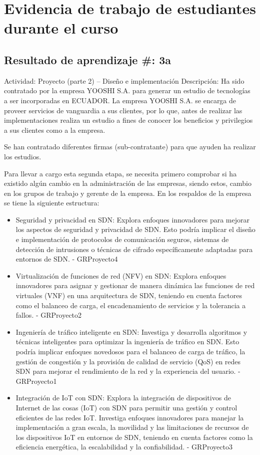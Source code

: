 \newpage
\section{Evidencia de trabajo de estudiantes durante el curso}

\subsection{Resultado de aprendizaje \#: 3a}
\label{sec:ra3a}
Actividad: Proyecto (parte 2) – Diseño e implementación
Descripción:
Ha sido contratado por la empresa YOOSHI S.A. para generar un estudio de tecnologías a ser incorporadas en ECUADOR. La empresa YOOSHI S.A. se encarga de proveer servicios de vanguardia a sus clientes, por lo que, antes de realizar las implementaciones realiza un estudio a fines de conocer los beneficios y privilegios a sus clientes como a la empresa. 

Se han contratado diferentes firmas (sub-contratante) para que ayuden ha realizar los estudios.

Para llevar a cargo esta segunda etapa, se necesita primero comprobar si ha existido algún cambio en la administración de las empresas, siendo estos, cambio en los grupos de trabajo y gerente de la empresa. En los respaldos de la empresa se tiene la siguiente estructura:  
\begin{itemize}
    \item Seguridad y privacidad en SDN: Explora enfoques innovadores para mejorar los aspectos de seguridad y privacidad de SDN. Esto podría implicar el diseño e implementación de protocolos de comunicación seguros, sistemas de detección de intrusiones o técnicas de cifrado específicamente adaptadas para entornos de SDN. - GRProyecto4
    \item Virtualización de funciones de red (NFV) en SDN: Explora enfoques innovadores para asignar y gestionar de manera dinámica las funciones de red virtuales (VNF) en una arquitectura de SDN, teniendo en cuenta factores como el balanceo de carga, el encadenamiento de servicios y la tolerancia a fallos. - GRProyecto2
    \item Ingeniería de tráfico inteligente en SDN: Investiga y desarrolla algoritmos y técnicas inteligentes para optimizar la ingeniería de tráfico en SDN. Esto podría implicar enfoques novedosos para el balanceo de carga de tráfico, la gestión de congestión y la provisión de calidad de servicio (QoS) en redes SDN para mejorar el rendimiento de la red y la experiencia del usuario. - GRProyecto1
    \item Integración de IoT con SDN: Explora la integración de dispositivos de Internet de las cosas (IoT) con SDN para permitir una gestión y control eficientes de las redes IoT. Investiga enfoques innovadores para manejar la implementación a gran escala, la movilidad y las limitaciones de recursos de los dispositivos IoT en entornos de SDN, teniendo en cuenta factores como la eficiencia energética, la escalabilidad y la confiabilidad. - GRProyecto3
\end{itemize}


